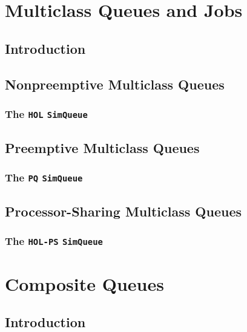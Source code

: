\documentclass[12pt]{book}
\begin{document}
\chapter{Multiclass Queues and Jobs}

\section{Introduction}

\section{Nonpreemptive Multiclass Queues}

\subsection{The \lstinline{HOL} \lstinline{SimQueue}}

\section{Preemptive Multiclass Queues}

\subsection{The \lstinline{PQ} \lstinline{SimQueue}}

\section{Processor-Sharing Multiclass Queues}

\subsection{The \lstinline{HOL-PS} \lstinline{SimQueue}}

\chapter{Composite Queues}

\section{Introduction}
\end{document}

